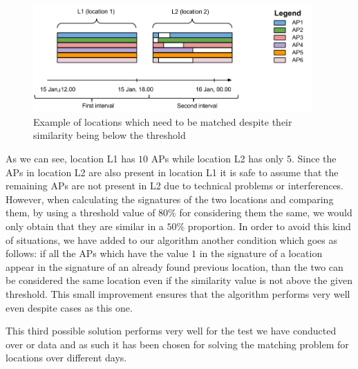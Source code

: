 \begin{figure}[!h]
\centering
\includegraphics[width=0.95\textwidth]{figures/matching/different_fp_same_loc.png}
\caption{Example of locations which need to be matched despite their similarity
being below the threshold}
\label{same_location_less_than_threshold}
\end{figure}

As we can see, location L1 has $10$ APs while location L2 has only $5$. Since
the APs in location L2 are also present in location L1 it is safe to assume that
the remaining APs are not present in L2 due to technical problems or
interferences. However, when calculating the signatures of the two locations and
comparing them, by using a threshold value of $80\%$ for considering them the
same, we would only obtain that they are similar in a $50\%$ proportion. In
order to avoid this kind of situations, we have added to our algorithm another
condition which goes as follows: if all the APs which have the value $1$ in the
signature of a location appear in the signature of an already found previous
location, than the two can be considered the same location even if the
similarity value is not above the given threshold. This small improvement
ensures that the algorithm performs very well even despite cases as this one.

This third possible solution performs very well for the test we have conducted
over or data and as such it has been chosen for solving the matching problem for
locations over different days.
